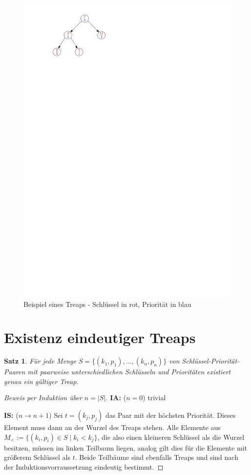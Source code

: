 \documentclass[a4paper]{scrreprt}
\newtheorem{satz}{Satz}[chapter]
\theoremstyle{definition}
\newenvironment{beweis}{\begin{proof}}{\end{proof}}
\begin{document}
\begin{figure}
\centering
\label{img:exampletreap}
\includegraphics{img/Beispiel_Treap.pdf}
\caption{Beispiel eines Treaps - Schlüssel in rot, Priorität in blau}
\end{figure}


\section{Existenz eindeutiger Treaps}
\label{sec:uniquetreaps}

\begin{satz}
Für jede Menge $S = \{(k_1,p_1), \dots, (k_n, p_n)\}$ von Schlüssel-Priorität-Paaren mit paarweise unterschiedlichen Schlüsseln und Prioritäten existiert genau ein gültiger Treap.
\end{satz}
\begin{beweis}[Beweis per Induktion über $n = |S|$]
\noindent\textbf{IA:} ($n = 0$) trivial

\noindent\textbf{IS:} ($n \to n+1$)
Sei $t = (k_j, p_j)$ das Paar mit der höchsten Priorität.
Dieses Element muss dann an der Wurzel des Treaps stehen.
Alle Elemente aus $M_< := \{(k_i, p_i) \in S \mid k_i < k_j\}$, die also einen kleineren Schlüssel als die Wurzel besitzen, müssen im linken Teilbaum liegen, analog gilt dies für die Elemente mit größerem Schlüssel als $t$.
Beide Teilbäume sind ebenfalls Treaps und sind nach der Induktionsvorraussetzung eindeutig bestimmt.
\end{beweis} %
\end{document}
